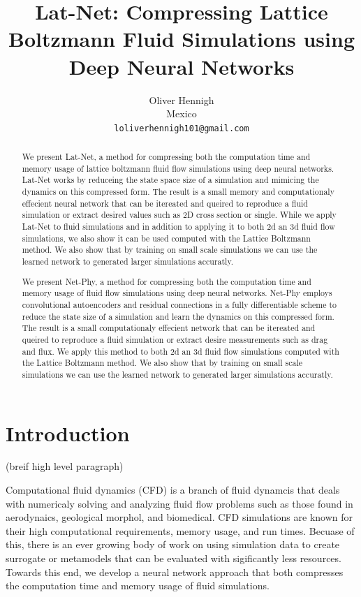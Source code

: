 \documentclass{article}
\title{Lat-Net: Compressing Lattice Boltzmann Fluid Simulations using Deep Neural Networks}
\author{
  Oliver Hennigh \\
  Mexico \\
  \texttt{loliverhennigh101@gmail.com} \\
}
\begin{document}

\maketitle

\begin{abstract}
We present Lat-Net, a method for compressing both the computation time and memory usage of lattice boltzmann fluid flow simulations using deep neural networks. Lat-Net works by reduceing the state space size of a simulation and mimicing the dynamics on this compressed form. The result is a small memory and computationaly effecient neural network that can be itereated and queired to reproduce a fluid simulation or extract desired values such as 2D cross section or single. While we apply Lat-Net to fluid simulations   and in addition to applying it to both 2d an 3d fluid flow simulations, we also show it can be used  computed with the Lattice Boltzmann method. We also show that by training on small scale simulations we can use the learned network to generated larger simulations accuratly.


We present Net-Phy, a method for compressing both the computation time and memory usage of fluid flow simulations using deep neural networks. Net-Phy employs convolutional autoencoders and residual connections in a fully differentiable scheme to reduce the state size of a simulation and learn the dynamics on this compressed form. The result is a small computationaly effecient network that can be itereated and queired to reproduce a fluid simulation or extract desire measurements such as drag and flux. We apply this method to both 2d an 3d fluid flow simulations computed with the Lattice Boltzmann method. We also show that by training on small scale simulations we can use the learned network to generated larger simulations accuratly.

\end{abstract}

\section{Introduction}

(breif high level paragraph)

Computational fluid dynamics (CFD) is a branch of fluid dynamcis that deals with numericaly solving and analyzing fluid flow problems such as those found in aerodynaics, geological morphol, and biomedical. CFD simulations are known for their high computational requirements, memory usage, and run times. Becuase of this, there is an ever growing body of work on using simulation data to create surrogate or metamodels that can be evaluated with sigificantly less resources. Towards this end, we develop a neural network approach that both compresses the computation time and memory usage of fluid simulations.
\end{document}
